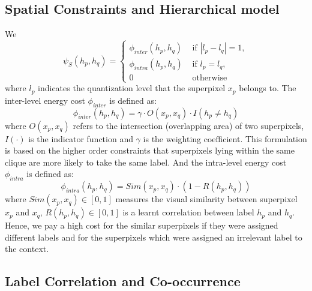 \subsection{Spatial Constraints and Hierarchical model}
We 
\begin{equation}
    \psi_{S}(h_p,h_q) =
    \begin{cases}
        \phi_{inter}(h_p,h_q) &\mbox{ if } | l_p - l_q | = 1,
        \\
        \phi_{intra}(h_p,h_q) &\mbox{ if } l_p = l_q,
        \\
        0 &\mbox{ otherwise }
    \end{cases}
\end{equation}
where $l_p$ indicates the quantization level that the superpixel $x_p$ belongs to. 
The inter-level energy cost $\phi_{inter}$ is defined as:
\begin{equation}
    \phi_{inter}(h_p,h_q) = \gamma \cdot O(x_p,x_q) \cdot I(h_p \neq h_q)
\end{equation}
where $O(x_p,x_q)$ refers to the intersection (overlapping area) of two superpixels, $I(\cdot)$ is the indicator function and $\gamma$ is the weighting coefficient. This formulation is based on the higher order constraints \cite{kohli2009robust,ladicky2009associative} that superpixels lying within the same clique are more likely to take the same label.
And the intra-level energy cost $\phi_{intra}$ is defined as:
\begin{equation}
    \phi_{intra}(h_p,h_q) = Sim(x_p,x_q) \cdot (1-R(h_p,h_q))
\end{equation}
where $Sim(x_p,x_q) \in [0,1]$ measures the visual similarity between superpixel $x_p$ and $x_q$, $R(h_p,h_q) \in [0,1]$ is a learnt correlation between label $h_p$ and $h_q$. Hence, we pay a high cost for the similar superpixels if they were assigned different labels and for the superpixels which were assigned an irrelevant label to the context.

\subsection{Label Correlation and Co-occurrence}


